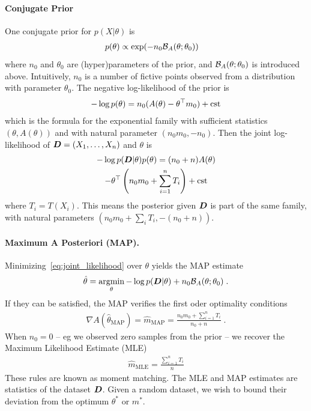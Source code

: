 \documentclass[twoside]{article}
\newcommand{\logpart}{A}
\newcommand{\bregman}{\cB_\logpart}
\newcommand{\nat}{\theta}
\newcommand{\m}{m}
\newcommand{\meanp}{\m}
\begin{document}
\paragraph{Conjugate Prior}
One conjugate prior \citep{agarwal2010geometric} for $p(X|\nat)$ is
\begin{align}
    p(\nat) &\propto \exp( - n_0 \bregman(\nat ; \nat_0) )
\end{align}
where $n_0$ and $\nat_0$ are (hyper)parameters of the prior, and $\bregman(\nat ; \nat_0)$ is introduced above.
Intuitively, $n_0$ is a number of fictive points observed from a distribution with parameter $\nat_0$.
The negative log-likelihood of the prior is
\begin{align*}
    -\log p(\nat) = n_0 (\logpart(\nat)  - \nat^\top \meanp_0 ) + \cst
\end{align*}
which is the formula for the exponential family with sufficient statistics $(\nat ,\logpart(\nat))$ and with natural parameter $(n_0 \m_0, -n_0)$.
Then the joint log-likelihood of ${\bm{D}} =(X_1,\dots,X_n)$ and $\nat$ is
\begin{multline}
    -\log p(\mD|\nat)p(\nat) 
    = (n_0+n) \logpart (\nat) \\
    - \theta^\top \left(n_0 \meanp_0 + \sum_{i=1}^n T_i \right) + \cst
    \label{eq:joint_likelihood}
\end{multline}
where $T_i=T(X_i)$.
This means the posterior given ${\bm{D}}$ is part of the same family, with natural parameters $(n_0 \m_0 + \sum_i T_i , -(n_0 + n))$.

\paragraph{Maximum A Posteriori (MAP).}
Minimizing~\eqref{eq:joint_likelihood} over $\nat$ yields the MAP estimate
\begin{align}
    \hat \nat = \argmin_\nat -\log p(\mD|\nat) + n_0 \bregman(\nat ; \nat_0) \; .
\end{align}
If they can be satisfied, the MAP verifies the first oder optimality conditions
\begin{align}
    \nabla \logpart(\hat \nat_\text{MAP}) = \hat \meanp_\text{MAP}
    = \frac{n_0 \meanp_0 + \sum_{i=1}^n T_i}{n_0+n} \; .
\end{align}
When $n_0=0$ -- eg we observed zero samples from the prior -- we recover the Maximum Likelihood Estimate (MLE)
\begin{align}
	\hat \m_\text{MLE} = \frac{\sum_{i=1}^n T_i}{n}
\end{align}
These rules are known as moment matching.
The MLE and MAP estimates are statistics of the dataset ${\bm{D}}$. Given a random dataset, we wish to bound their deviation from the optimum $\nat^*$ or $\meanp^*$.
\end{document}
